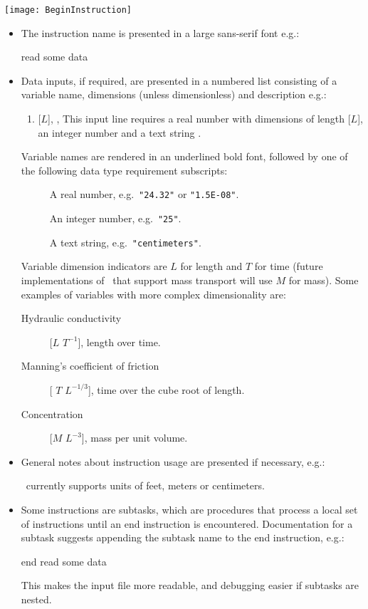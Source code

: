   \texttt{[image: BeginInstruction]}
\squish
\begin{itemize}

  \item The instruction name is presented in a large sans-serif font e.g.:

  {\Large \sf read some data }

  \item Data inputs, if required, are presented  in a numbered list consisting of a variable name, dimensions (unless dimensionless) and description e.g.:

        \begin{enumerate}
        \item {}[$L$], ,   This input line requires a real number  with dimensions of length [$L$], an integer number  and a text string .
        \end{enumerate}

        Variable names are rendered in an underlined bold font, followed by one of the following data type requirement subscripts:
        \begin{description}
            \item [\rnum{}] A real number, e.g.\ {\tt "24.32"} or {\tt "1.5E-08"}.  
            \item [\inum{}] An integer number, e.g.\ {\tt "25"}.
            \item [\str{}] A text string, e.g.\ {\tt "centimeters"}.
       \end{description}
       
       Variable dimension indicators are $L$ for length and  $T$ for time (future implementations of \mut\ that support mass  transport will use $M$ for mass). Some examples of variables with more complex dimensionality are:
        \begin{description}
            \item [Hydraulic conductivity] [$L$   $T^{-1}$], length over time.
            \item [Manning's coefficient of friction] [ $T$ $L^{-1/3}$], time over the cube root of length.
            \item [Concentration] [$M$  $L^{-3}$], mass per unit volume.
        \end{description}



  \item General notes about instruction usage are presented if necessary, e.g.:

         \mfus\ currently supports units of feet, meters or centimeters.

  \item Some instructions are subtasks, which are procedures that process a local set of instructions until an \textsf{end} instruction is encountered.  Documentation for a subtask suggests appending the subtask name to the {\sf end} instruction, e.g.:
  
      {\Large \sf end read some data }

      This makes the input file more readable, and debugging easier if subtasks are nested.

\end{itemize}
